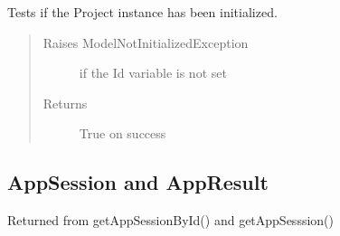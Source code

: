 \documentclass[letterpaper,10pt,english]{sphinxmanual}
\begin{document}
\begin{fulllineitems}
\begin{fulllineitems}
\begin{quote}
\begin{description}
\begin{itemize}
\end{itemize}

\end{description}\end{quote}

\end{fulllineitems}


\begin{fulllineitems}
\label{Available modules:BaseSpacePy.model.Project.Project.isInit}
Tests if the Project instance has been initialized.
\begin{quote}\begin{description}
\item[{Raises ModelNotInitializedException}] \leavevmode
if the Id variable is not set

\item[{Returns}] \leavevmode
True on success

\end{description}\end{quote}

\end{fulllineitems}


\end{fulllineitems}



\subsection{AppSession and AppResult}
\label{Available modules:appsession-and-appresult}

\begin{fulllineitems}
\label{Available modules:BaseSpacePy.model.AppSession.AppSession}
Returned from getAppSessionById() and getAppSesssion()

\end{fulllineitems}

\end{document}
